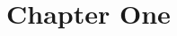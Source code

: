 \documentclass[../main.tex]{subfiles}
\begin{document}
\chapter{Chapter One}

\lipsum[1-3]
\end{document}
